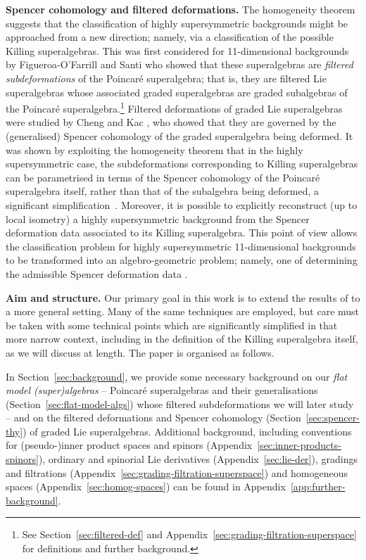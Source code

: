 \documentclass[pdftex]{sigma}
\numberwithin{equation}{section}
\newcommand{\1}{\mathbbm{1}}
\begin{document}
{\bf Spencer cohomology and filtered deformations.}
The homogeneity theorem suggests that the classification of highly supersymmetric backgrounds might be approached from a new direction; namely, via a classification of the possible Killing superalgebras. This was first considered for 11-dimensional backgrounds by Figueroa-O'Farrill and Santi \cite{Figueroa-OFarrill2017_1,Figueroa-OFarrill2017,Santi2022} who showed that these superalgebras are \emph{filtered subdeformations} of the Poincar\'e superalgebra; that is, they are filtered Lie superalgebras whose associated graded superalgebras are graded subalgebras of the Poincar\'e superalgebra.\footnote{See Section~\ref{sec:filtered-def} and Appendix~\ref{sec:grading-filtration-superspace} for definitions and further background.} Filtered deformations of graded Lie superalgebras were studied by Cheng and Kac \cite{Cheng1998}, who showed that they are governed by the (generalised) Spencer cohomology of the graded superalgebra being deformed. It was shown by exploiting the homogeneity theorem that in the highly supersymmetric case, the subdeformations corresponding to Killing superalgebras can be parametrised in terms of the Spencer cohomology of the Poincar\'e superalgebra itself, rather than that of the subalgebra being deformed, a significant simplification~\cite{Figueroa-OFarrill2017_1}. Moreover, it is possible to explicitly reconstruct (up to local isometry) a highly supersymmetric background from the Spencer deformation data associated to its Killing superalgebra. This point of view allows the classification problem for highly supersymmetric 11-dimensional backgrounds to be transformed into an algebro-geometric problem; namely, one of determining the admissible Spencer deformation data \cite{Santi2022}.

{\bf Aim and structure.}
Our primary goal in this work is to extend the results of \cite{Figueroa-OFarrill2017_1} to a more general setting. Many of the same techniques are employed, but care must be taken with some technical points which are significantly simplified in that more narrow context, including in the definition of the Killing superalgebra itself, as we will discuss at length. The paper is organised as follows.

In Section~\ref{sec:background}, we provide some necessary background on our \emph{flat model (super)algebras} -- Poincar\'e superalgebras and their generalisations (Section~\ref{sec:flat-model-algs}) whose filtered subdeformations we will later study -- and on the filtered deformations and Spencer cohomology (Section~\ref{sec:spencer-thy}) of graded Lie superalgebras. Additional background, including conventions for (pseudo-)inner product spaces and spinors (Appendix~\ref{sec:inner-products-spinors}), ordinary and spinorial Lie derivatives (Appen\-dix~\ref{sec:lie-der}), gradings and filtrations (Appendix~\ref{sec:grading-filtration-superspace}) and homogeneous spaces (Appendix~\ref{sec:homog-spaces}) can be found in Appendix~\ref{app:further-background}.
\end{document}

